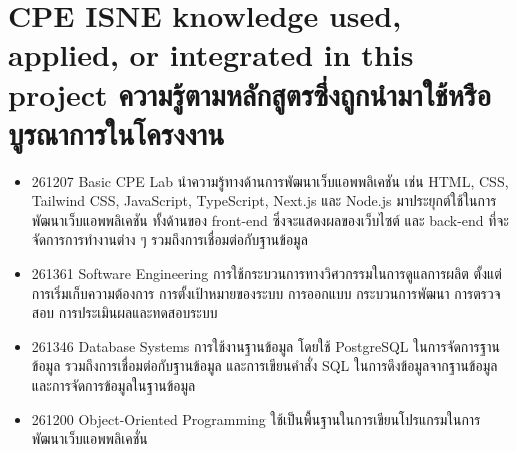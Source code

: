 \section{\ifenglish%
      \ifcpe CPE \else ISNE \fi knowledge used, applied, or integrated in this project
  \else%
      ความรู้ตามหลักสูตรซึ่งถูกนำมาใช้หรือบูรณาการในโครงงาน
  \fi
 }

\begin{itemize}
    \item 261207 Basic CPE Lab นําความรู้ทางด้านการพัฒนาเว็บแอพพลิเคชัน เช่น HTML, CSS, Tailwind CSS, JavaScript, TypeScript, Next.js
          และ Node.js มาประยุกต์ใช้ในการพัฒนาเว็บแอพพลิเคชัน ทั้งด้านของ front-end ซึ่งจะแสดงผลของเว็บไซต์ และ back-end ที่จะจัดการการทำงานต่าง ๆ รวมถึงการเชื่อมต่อกับฐานข้อมูล
    \item 261361 Software Engineering การใช้กระบวนการทางวิศวกรรมในการดูแลการผลิต ตั้งแต่การเริ่มเก็บความต้องการ การตั้งเป้าหมายของระบบ การออกแบบ กระบวนการพัฒนา การตรวจสอบ การประเมินผลและทดสอบระบบ
    \item 261346 Database Systems การใช้งานฐานข้อมูล โดยใช้ PostgreSQL ในการจัดการฐานข้อมูล รวมถึงการเชื่อมต่อกับฐานข้อมูล
          และการเขียนคำสั่ง SQL ในการดึงข้อมูลจากฐานข้อมูลและการจัดการข้อมูลในฐานข้อมูล

    \item 261200 Object-Oriented Programming ใช้เป็นพื้นฐานในการเขียนโปรแกรมในการพัฒนาเว็บแอพพลิเคชั่น 
\end{itemize}



